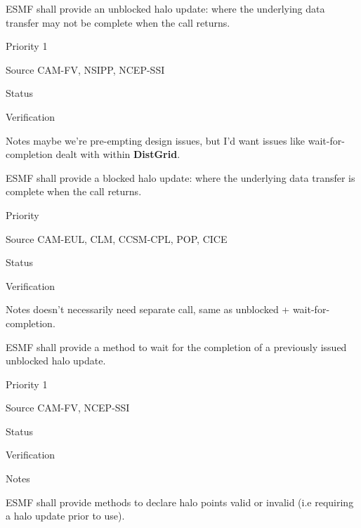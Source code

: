  \label{DG:halo}


ESMF shall provide an unblocked halo update: where the underlying
data transfer may not be complete when the call returns.

\begin{reqlist}
\item[Priority] 1
\item[Source] CAM-FV, NSIPP, NCEP-SSI
\item[Status]
\item[Verification]
\item[Notes] maybe we're pre-empting design issues, but I'd want
  issues like wait-for-completion dealt with within \textbf{DistGrid}.
\end{reqlist}


ESMF shall provide a blocked halo update: where the underlying
data transfer is complete when the call returns.

\begin{reqlist}
\item[Priority]
\item[Source] CAM-EUL, CLM, CCSM-CPL, POP, CICE
\item[Status]
\item[Verification]
\item[Notes] doesn't necessarily need separate call, same as unblocked
  + wait-for-completion.
\end{reqlist}


ESMF shall provide a method to wait for the completion of a previously
issued unblocked halo update.

\begin{reqlist}
\item[Priority] 1
\item[Source] CAM-FV, NCEP-SSI
\item[Status]
\item[Verification]
\item[Notes]
\end{reqlist}


ESMF shall provide methods to declare halo points valid or invalid
(i.e requiring a halo update prior to use).

